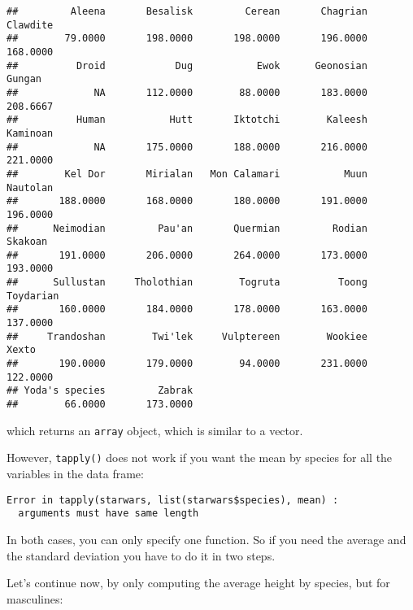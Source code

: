 \documentclass[
]{article}
\newenvironment{Shaded}{\begin{snugshade}}{\end{snugshade}}
\newcommand{\DataTypeTok}[1]{\textcolor[rgb]{0.13,0.29,0.53}{#1}}
\newcommand{\KeywordTok}[1]{\textcolor[rgb]{0.13,0.29,0.53}{\textbf{#1}}}
\newcommand{\NormalTok}[1]{#1}
\newcommand{\OperatorTok}[1]{\textcolor[rgb]{0.81,0.36,0.00}{\textbf{#1}}}
\newcommand{\StringTok}[1]{\textcolor[rgb]{0.31,0.60,0.02}{#1}}
\begin{document}
\begin{verbatim}
##         Aleena       Besalisk         Cerean       Chagrian       Clawdite 
##        79.0000       198.0000       198.0000       196.0000       168.0000 
##          Droid            Dug           Ewok      Geonosian         Gungan 
##             NA       112.0000        88.0000       183.0000       208.6667 
##          Human           Hutt       Iktotchi        Kaleesh       Kaminoan 
##             NA       175.0000       188.0000       216.0000       221.0000 
##        Kel Dor       Mirialan   Mon Calamari           Muun       Nautolan 
##       188.0000       168.0000       180.0000       191.0000       196.0000 
##      Neimodian         Pau'an       Quermian         Rodian        Skakoan 
##       191.0000       206.0000       264.0000       173.0000       193.0000 
##      Sullustan     Tholothian        Togruta          Toong      Toydarian 
##       160.0000       184.0000       178.0000       163.0000       137.0000 
##     Trandoshan        Twi'lek     Vulptereen        Wookiee          Xexto 
##       190.0000       179.0000        94.0000       231.0000       122.0000 
## Yoda's species         Zabrak 
##        66.0000       173.0000
\end{verbatim}

which returns an \texttt{array} object, which is similar to a vector.

However, \texttt{tapply()} does not work if you want the mean by species for all the variables in the
data frame:

\begin{Shaded}
\end{Shaded}

\begin{verbatim}
Error in tapply(starwars, list(starwars$species), mean) :
  arguments must have same length
\end{verbatim}

In both cases, you can only specify one function. So if you need the average and the standard
deviation you have to do it in two steps.

Let's continue now, by only computing the average height by species, but for masculines:

\begin{Shaded}
\end{Shaded}
\end{document}

